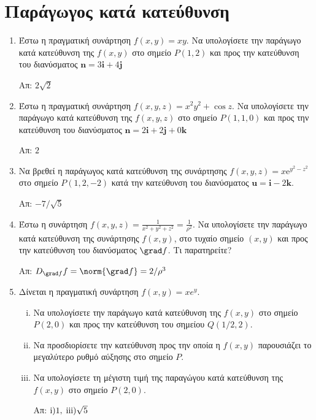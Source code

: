 \section*{Παράγωγος κατά κατεύθυνση}

\begin{enumerate}
  \item Έστω η πραγματική συνάρτηση $ f(x,y) = xy$.  Να υπολογίσετε την παράγωγο 
    κατά κατεύθυνση της $ f(x,y) $ στο σημείο $ P(1,2) $ και προς την κατεύθυνση 
    του διανύσματος $ \mathbf{n} = 3 \mathbf{i} + 4 \mathbf{j} $

    \hfill Απ: $ 2 \sqrt{2} $ 



  \item Έστω η πραγματική συνάρτηση $ f(x,y,z) = x^{2}y^{2} + \cos{z} $.  
    Να υπολογίσετε την παράγωγο κατά κατεύθυνση της $ f(x,y,z) $ στο σημείο 
    $ P(1,1,0) $ και προς την κατεύθυνση 
    του διανύσματος $ \mathbf{n} = 2 \mathbf{i} + 2 \mathbf{j} + 0 \mathbf{k} $

    \hfill Απ: $ 2 $ 


  \item Να βρεθεί η παράγωγος κατά κατεύθυνση της συνάρτησης 
    $ f(x,y,z) = x \mathrm{e}^{y^{2}-z^{2}} $ στο σημείο $ P(1,2,-2) $ κατά 
    την κατεύθυνση του διανύσματος $ \mathbf{u} = \mathbf{i}-2 \mathbf{k} $.

    \hfill Απ: $ - 7/\sqrt{5} $ 

  \item Έστω η συνάρτηση $ f(x,y,z) = \frac{1}{x^{2}+y^{2}+z^{2}} = 
    \frac{1}{\rho ^{2}} $. Να υπολογίσετε την παράγωγο κατά κατεύθυνση της 
    συνάρτησης $ f(x,y) $, στο τυχαίο σημείο $ (x,y) $ και προς την κατεύθυνση 
    του διανύσματος $ \grad f $. Τι παρατηρείτε?

    \hfill Απ: $ D_{\grad f}f = \norm{\grad f} = 2/\rho ^{3} $ 

  \item Δίνεται η πραγματική συνάρτηση $ f(x,y) = xe^{y} $.
    \begin{enumerate}[i)]
      \item Να υπολογίσετε την παράγωγο κατά κατεύθυνση της $ f(x,y) $ στο σημείο 
        $ P(2,0) $ και προς την κατεύθυνση του σημείου $ Q(1/2, 2) $.
      \item Να προσδιορίσετε την κατεύθυνση προς την οποία η $ f(x,y) $ παρουσιάζει το
        μεγαλύτερο ρυθμό αύξησης στο σημείο $ P $.
      \item Να υπολογίσετε τη μέγιστη τιμή της παραγώγου κατά κατεύθυνση της 
        $ f(x,y) $ στο σημείο $ P(2,0) $.

        \hfill Απ: $ \rm{i}) 1, \; iii) \sqrt{ 5 } $ 
    \end{enumerate}
\end{enumerate}

